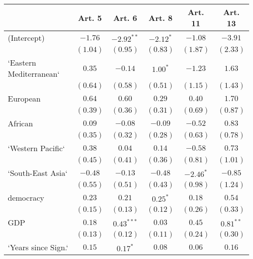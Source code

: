 
\begin{table}[!h]
\begin{center}
\begin{tabular}{l c c c c c }
\toprule
 & Art. 5 & Art. 6 & Art. 8 & Art. 11 & Art. 13 \\
\midrule
(Intercept)             & $-1.76$      & $-2.92^{**}$ & $-2.12^{*}$  & $-1.08$      & $-3.91$      \\
                        & $(1.04)$     & $(0.95)$     & $(0.83)$     & $(1.87)$     & $(2.33)$     \\
`Eastern Mediterranean` & $0.35$       & $-0.14$      & $1.00^{*}$   & $-1.23$      & $1.63$       \\
                        & $(0.64)$     & $(0.58)$     & $(0.51)$     & $(1.15)$     & $(1.43)$     \\
European                & $0.64$       & $0.60$       & $0.29$       & $0.40$       & $1.70$       \\
                        & $(0.39)$     & $(0.36)$     & $(0.31)$     & $(0.69)$     & $(0.87)$     \\
African                 & $0.09$       & $-0.08$      & $-0.09$      & $-0.52$      & $0.83$       \\
                        & $(0.35)$     & $(0.32)$     & $(0.28)$     & $(0.63)$     & $(0.78)$     \\
`Western Pacific`       & $0.38$       & $0.04$       & $0.14$       & $-0.58$      & $0.73$       \\
                        & $(0.45)$     & $(0.41)$     & $(0.36)$     & $(0.81)$     & $(1.01)$     \\
`South-East Asia`       & $-0.48$      & $-0.13$      & $-0.48$      & $-2.46^{*}$  & $-0.85$      \\
                        & $(0.55)$     & $(0.51)$     & $(0.43)$     & $(0.98)$     & $(1.24)$     \\
democracy               & $0.23$       & $0.21$       & $0.25^{*}$   & $0.18$       & $0.54$       \\
                        & $(0.15)$     & $(0.13)$     & $(0.12)$     & $(0.26)$     & $(0.33)$     \\
GDP                     & $0.18$       & $0.43^{***}$ & $0.03$       & $0.45$       & $0.81^{**}$  \\
                        & $(0.13)$     & $(0.12)$     & $(0.11)$     & $(0.24)$     & $(0.30)$     \\
`Years since Sign.`     & $0.15$       & $0.17^{*}$   & $0.08$       & $0.06$       & $0.16$       \\

\end{tabular}
\end{center}
\end{table}
